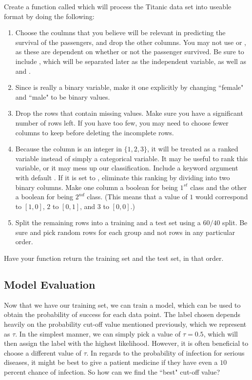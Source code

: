 \begin{problem}
Create a function called  which will process the Titanic data set into useable format by doing the following:
\begin{enumerate}
\item Choose the coulmns that you believe will be relevant in predicting the survival of the passengers, and drop the other columns.  You may not use  or , as these are dependent on whether or not the passenger survived.  Be sure to include , which will be separated later as the independent variable, as well as  and .
\item Since  is really a binary variable, make it one explicitly by changing ``female" and ``male" to be binary values.
\item Drop the rows that contain missing values.  Make sure you have a significant number of rows left.  If you have too few, you may need to choose fewer columns to keep before deleting the incomplete rows.
\item Because the  column is an integer in $\{1, 2, 3\}$, it will be treated as a ranked variable instead of simply a categorical variable.  It may be useful to rank this variable, or it may mess up our classification.  Include a keyword argument  with default .  If it is set to , eliminate this ranking by dividing  into two binary columns.  Make one column a boolean for being $1^{st}$ class and the other a boolean for being $2^{nd}$ class. (This means that a value of $1$ would correspond to $[1, 0]$, $2$ to $[0, 1]$, and $3$ to $[0, 0]$.)
\item Split the remaining rows into a training and a test set using a $60/40$ split.  Be sure and pick random rows for each group and not rows in any particular order.
\end{enumerate}
Have your function return the training set and the test set, in that order.
\end{problem}

\subsection*{Model Evaluation}
Now that we have our training set, we can train a model, which can be used to obtain the probability of success for each data point.  The label chosen depends heavily on the probability cut-off value mentioned previously, which we represent as $\tau$.  In the simplest manner, we can simply pick a value of $\tau = 0.5$, which will then assign the label with the highest likelihood.  However, it is often beneficial to choose a different value of $\tau$.  In regards to the probability of infection for serious diseases, it might be best to give a patient medicine if they have even a $10$ percent chance of infection.  So how can we find the ``best" cut-off value?

